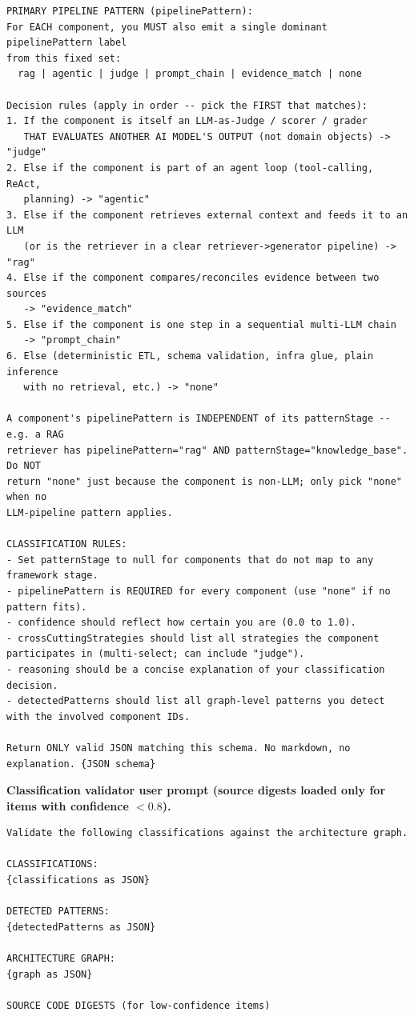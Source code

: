 \documentclass[11pt]{article}
\newcommand{\promptlabel}[1]{\vspace{2pt}\noindent\textbf{\small #1}\par\nobreak\vspace{1pt}}
\begin{document}
\begin{lstlisting}[style=prompt]
PRIMARY PIPELINE PATTERN (pipelinePattern):
For EACH component, you MUST also emit a single dominant pipelinePattern label
from this fixed set:
  rag | agentic | judge | prompt_chain | evidence_match | none

Decision rules (apply in order -- pick the FIRST that matches):
1. If the component is itself an LLM-as-Judge / scorer / grader
   THAT EVALUATES ANOTHER AI MODEL'S OUTPUT (not domain objects) -> "judge"
2. Else if the component is part of an agent loop (tool-calling, ReAct,
   planning) -> "agentic"
3. Else if the component retrieves external context and feeds it to an LLM
   (or is the retriever in a clear retriever->generator pipeline) -> "rag"
4. Else if the component compares/reconciles evidence between two sources
   -> "evidence_match"
5. Else if the component is one step in a sequential multi-LLM chain
   -> "prompt_chain"
6. Else (deterministic ETL, schema validation, infra glue, plain inference
   with no retrieval, etc.) -> "none"

A component's pipelinePattern is INDEPENDENT of its patternStage -- e.g. a RAG
retriever has pipelinePattern="rag" AND patternStage="knowledge_base". Do NOT
return "none" just because the component is non-LLM; only pick "none" when no
LLM-pipeline pattern applies.

CLASSIFICATION RULES:
- Set patternStage to null for components that do not map to any framework stage.
- pipelinePattern is REQUIRED for every component (use "none" if no pattern fits).
- confidence should reflect how certain you are (0.0 to 1.0).
- crossCuttingStrategies should list all strategies the component participates in (multi-select; can include "judge").
- reasoning should be a concise explanation of your classification decision.
- detectedPatterns should list all graph-level patterns you detect with the involved component IDs.

Return ONLY valid JSON matching this schema. No markdown, no explanation. {JSON schema}
\end{lstlisting}

\promptlabel{Classification validator user prompt (source digests loaded only for items with confidence $<0.8$).}
\begin{lstlisting}[style=prompt]
Validate the following classifications against the architecture graph.

CLASSIFICATIONS:
{classifications as JSON}

DETECTED PATTERNS:
{detectedPatterns as JSON}

ARCHITECTURE GRAPH:
{graph as JSON}

SOURCE CODE DIGESTS (for low-confidence items)
\end{lstlisting}
\end{document}
